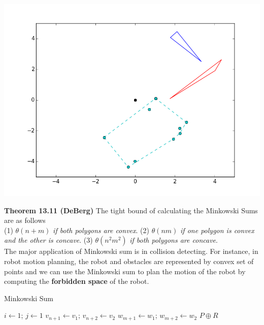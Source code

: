 \documentclass[10pt]{article}
\begin{document}
\begin{multicols}{2}
\centerline{\includegraphics[scale=0.4]{minkowski_noncolliding.png}}
\textbf{Theorem 13.11 (DeBerg)} The tight bound of calculating the Minkowski Sums are as follows \newline \\
(1) $\theta(n+m)$ \emph{if both polygons are convex}. \newline
(2) $\theta(nm)$ \emph{if one polygon is convex and the other is concave}. \newline
(3) $\theta(n^2m^2)$ \emph{if both polygons are concave}. \newline \\
\indent The major application of Minkowski sum is in collision detecting. For instance, in robot motion planning, the robot and obstacles are represented by convex set of points and we can use the Minkowski sum to plan the motion of the robot by computing the \textbf{forbidden space} of the robot. \newline \\
\begin{algorithm}[H]
\caption{Minkowski Sum}
\SetAlgoLined
{}
$i \leftarrow 1$; $j \leftarrow 1$\;
$v_{n+1} \leftarrow v_1$; $v_{n+2} \leftarrow v_2$\;
$w_{m+1} \leftarrow w_1$; $w_{m+2} \leftarrow w_2$\;
\Return $P \oplus R$\;
\end{algorithm}


\end{multicols}
\end{document}
